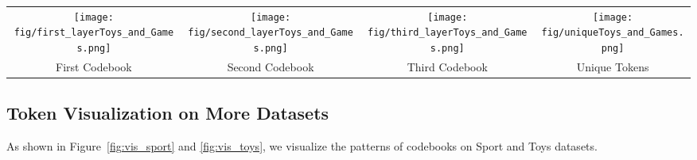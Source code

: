 \begin{figure*}[htb!]
		\centering
		\begin{tabular}{cccc}
\texttt{[image: fig/first\_layerToys\_and\_Games.png]} &
       \texttt{[image: fig/second\_layerToys\_and\_Games.png]}  & \texttt{[image: fig/third\_layerToys\_and\_Games.png]}  &
       \texttt{[image: fig/uniqueToys\_and\_Games.png]}
	     \\ First Codebook & Second Codebook & Third Codebook & Unique Tokens
		\end{tabular}
	\caption{The patterns of codebooks are various across different layers and unique tokens are uniform for different items on Toys dataset.}	\label{fig:vis_toys}
\end{figure*} 

\subsection{Token Visualization on More Datasets}\label{sec:visual_token}
As shown in Figure~\ref{fig:vis_sport} and \ref{fig:vis_toys}, we visualize the patterns of codebooks on Sport and Toys datasets.
